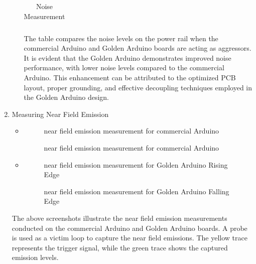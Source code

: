 \documentclass[a4paper,11pt]{article}%
\begin{document}
\begin{enumerate}
\begin{itemize}
\begin{table}[H]
\begin{tabular}{ |l |c | c|}
		\hline\hline
	\end{tabular}
	\caption{Noise Measurement}
	\label{filterspecs}
\end{table}

		            The table compares the noise levels on the power rail when the commercial Arduino and Golden Arduino boards are acting as aggressors. It is evident that the Golden Arduino demonstrates improved noise performance, with lower noise levels compared to the commercial Arduino. This enhancement can be attributed to the optimized PCB layout, proper grounding, and effective decoupling techniques employed in the Golden Arduino design.
	      \end{itemize}

	\item Measuring Near Field Emission
	      \begin{itemize}
		      \item
		            \begin{figure}[H]
			            \centering
			            \caption{near field emission measurement for commercial Arduino}
		            \end{figure}

		            \begin{figure}[H]
			            \centering
			            \caption{near field emission measurement for commercial Arduino}
		            \end{figure}
		      \item
		            \begin{figure}[H]
			            \centering
			            \caption{near field emission measurement for Golden Arduino Rising Edge}
		            \end{figure}

		            \begin{figure}[H]
			            \centering
			            \caption{near field emission measurement for Golden Arduino Falling Edge}
		            \end{figure}
	      \end{itemize}




	      The above screenshots illustrate the near field emission measurements conducted on the commercial Arduino and Golden Arduino boards. A probe is used as a victim loop to capture the near field emissions. The yellow trace represents the trigger signal, while the green trace shows the captured emission levels.


\end{enumerate}
\end{document}
